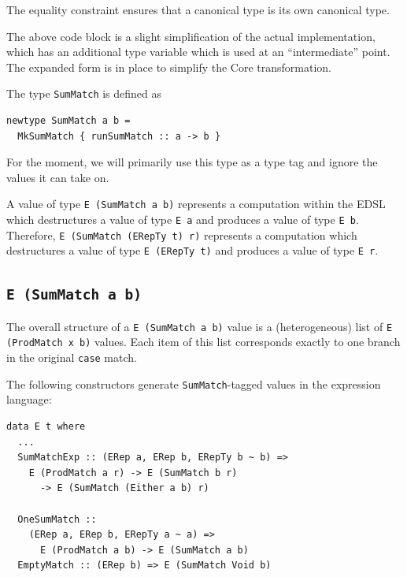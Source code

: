 \documentclass[runningheads, a4paper]{llncs}
\newcommand{\ttt}{\texttt}
\newenvironment{todo}
  {\ifthenelse{\isundefined{\showtodos}}{\comment}{\begin{tcolorbox}
    \textbf{TODO}:}}
  {\ifthenelse{\isundefined{\showtodos}}{\endcomment}{\end{tcolorbox}}
  }
\begin{document}
The equality constraint ensures that a canonical type is its own canonical type.


The above code block is a slight simplification of the actual implementation,
which has an additional type variable which is used at an ``intermediate'' point.
The expanded form is in place to simplify the Core transformation.

The type \ttt{SumMatch} is defined as

\begin{lstlisting}
newtype SumMatch a b =
  MkSumMatch { runSumMatch :: a -> b }
\end{lstlisting}

For the moment, we will primarily use this type as a type tag and ignore
the values it can take on.

A value of type \ttt{E (SumMatch a b)} represents a computation within the EDSL
which destructures a value of type \ttt{E a} and produces a value of type \ttt{E b}.
Therefore, \ttt{E (SumMatch (ERepTy t) r)} represents a computation which destructures
a value of type \ttt{E (ERepTy t)} and produces a value of type \ttt{E r}.



\subsection{\ttt{E (SumMatch a b)}}

The overall structure of a \ttt{E (SumMatch a b)} value is a (heterogeneous)
list of \ttt{E (ProdMatch x b)} values.  Each item of this list corresponds
exactly to one branch in the original \ttt{case} match.

The following constructors generate \ttt{SumMatch}-tagged values in the
expression language:

\begin{lstlisting}
data E t where
  ...
  SumMatchExp :: (ERep a, ERep b, ERepTy b ~ b) =>
    E (ProdMatch a r) -> E (SumMatch b r)
      -> E (SumMatch (Either a b) r)

  OneSumMatch ::
    (ERep a, ERep b, ERepTy a ~ a) =>
      E (ProdMatch a b) -> E (SumMatch a b)
  EmptyMatch :: (ERep b) => E (SumMatch Void b)
\end{lstlisting}
\end{document}
